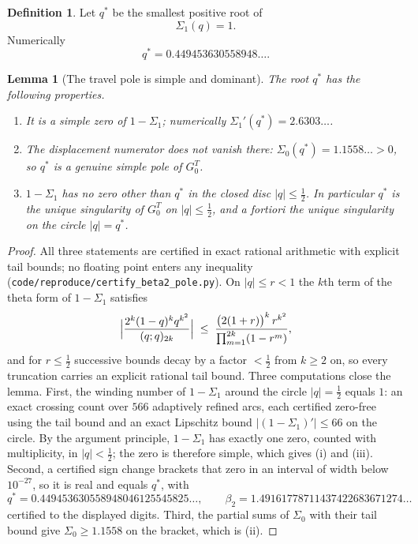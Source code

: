 \documentclass[11pt]{article}
\theoremstyle{plain}
\newtheorem{lemma}[theorem]{Lemma}
\theoremstyle{definition}
\newtheorem{definition}[theorem]{Definition}
\theoremstyle{remark}
\begin{document}
\begin{definition}\label{def:beta2-qstar}
Let $q^\ast$ be the smallest positive root of
\[
  \Sigma_1(q)=1 .
\]
Numerically
\[
  q^\ast=0.449453630558948\ldots .
\]
\end{definition}

\begin{lemma}[The travel pole is simple and dominant]
\label{lem:beta2-pole}
The root $q^\ast$ has the following properties.
\begin{enumerate}
\item[(i)] It is a \emph{simple} zero of $1-\Sigma_1$; numerically
  $\Sigma_1'(q^\ast)=2.6303\ldots$.
\item[(ii)] The displacement numerator does not vanish there:
  $\Sigma_0(q^\ast)=1.1558\ldots>0$, so $q^\ast$ is a genuine simple pole of
  $G^{T}_0$.
\item[(iii)] $1-\Sigma_1$ has no zero other than $q^\ast$ in the closed disc
  $|q|\le\tfrac12$. In particular $q^\ast$ is the unique singularity of
  $G^{T}_0$ on $|q|\le\tfrac12$, and a fortiori the unique singularity on the
  circle $|q|=q^\ast$.
\end{enumerate}
\end{lemma}

\begin{proof}
All three statements are certified in exact rational arithmetic with explicit
tail bounds; no floating point enters any inequality
(\texttt{code/reproduce/certify\_beta2\_pole.py}). On $|q|\le r<1$ the $k$th term
of the theta form of $1-\Sigma_1$ satisfies
\[
  \Bigl|\frac{2^k(1-q)^k q^{k^2}}{(q;q)_{2k}}\Bigr|
  \;\le\;\frac{\bigl(2(1+r)\bigr)^k\,r^{k^2}}{\prod_{m=1}^{2k}(1-r^m)},
\]
and for $r\le\tfrac12$ successive bounds decay by a factor $<\tfrac12$ from
$k\ge2$ on, so every truncation carries an explicit rational tail bound.
Three computations close the lemma. First, the winding number of $1-\Sigma_1$
around the circle $|q|=\tfrac12$ equals $1$: an exact crossing count over
$566$ adaptively refined arcs, each certified zero-free using the tail bound
and an exact Lipschitz bound $|(1-\Sigma_1)'|\le66$ on the circle. By the
argument principle, $1-\Sigma_1$ has exactly one zero, counted with
multiplicity, in $|q|<\tfrac12$; the zero is therefore simple, which gives
(i) and (iii). Second, a certified sign change brackets that zero in an
interval of width below $10^{-27}$, so it is real and equals $q^\ast$, with
\[
  q^\ast=0.449453630558948046125545825\ldots,
  \qquad
  \beta_2=1.49161778711437422683671274\ldots
\]
certified to the displayed digits. Third, the partial sums of $\Sigma_0$
with their tail bound give $\Sigma_0\ge1.1558$ on the bracket, which is (ii).
\end{proof}
\end{document}
